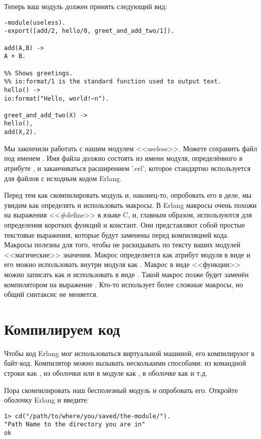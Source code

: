 Теперь ваш модуль  должен принять следующий вид:
\begin{lstlisting}[style=erlang]
-module(useless).
-export([add/2, hello/0, greet_and_add_two/1]).
 
add(A,B) ->
A + B.
 
%% Shows greetings.
%% io:format/1 is the standard function used to output text.
hello() ->
io:format("Hello, world!~n").
 
greet_and_add_two(X) ->
hello(),
add(X,2).
\end{lstlisting}

Мы закончили работать с нашим модулем <<useless>>.
Можете сохранить файл под именем .
Имя файла должно состоять из имени модуля, определённого в атрибуте , и заканчиваться расширением '.erl', которое стандартно используется для файлов с исходным кодом Erlang.

Перед тем как скомпилировать модуль и, наконец\--то, опробовать его в деле, мы увидим как определять и использовать макросы.
В Erlang макросы очень похожи на выражения <<\#define>> в языке C, и, главным образом, используются для определения коротких функций и констант.
Они представляют собой простые текстовые выражения, которые будут заменены перед компиляцией кода.
Макросы полезны для того, чтобы не раскидывать по тексту ваших модулей <<магические>> значения.
Макрос определяется как атрибут модуля в виде  и его можно использовать внутри модуля как .
Макрос в виде <<функции>> можно записать как  и использовать в виде .
Такой макрос позже будет заменён компилятором на выражение .
Кто\--то использует более сложные макросы, но общий синтаксис не меняется.
\section{Компилируем код}
\label{compiling-the-code}
Чтобы код Erlang мог использоваться виртуальной машиной, его компилируют в байт\--код.
Компилятор можно вызывать несколькими способами: из командной строки как , из оболочки или в модуле как , в оболочке как  и т.д.

Пора скомпилировать наш бесполезный модуль и опробовать его.
Откройте оболочку Erlang и введите:
\begin{lstlisting}[style=erlang]
1> cd("/path/to/where/you/saved/the-module/").
"Path Name to the directory you are in"
ok
\end{lstlisting}

